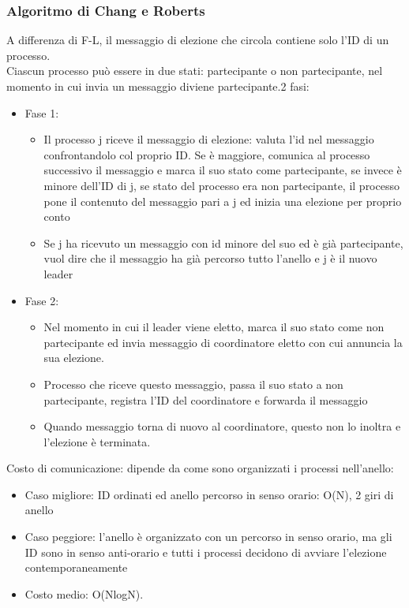 \documentclass{article}
\begin{document}
\subsubsection{Algoritmo di Chang e Roberts}
A differenza di F-L, il messaggio di elezione che circola contiene solo l'ID di un processo.\\ Ciascun processo può essere in due stati: partecipante o non partecipante, nel momento in cui invia un messaggio diviene partecipante.2 fasi:
\begin{itemize}
\item Fase 1:
\begin{itemize}
\item Il processo j riceve il messaggio di elezione: valuta l'id nel messaggio confrontandolo col proprio ID. Se è maggiore, comunica al processo successivo il messaggio e marca il suo stato come partecipante, se invece è minore dell'ID di j, se stato del processo era non partecipante, il processo pone il contenuto del messaggio pari a j ed inizia una elezione per proprio conto
\item Se j ha ricevuto un messaggio con id minore del suo ed è già partecipante, vuol dire che il messaggio ha già percorso tutto l'anello e j è il nuovo leader
\end{itemize}
\item Fase 2:
\begin{itemize}
\item Nel momento in cui il leader viene eletto, marca il suo stato come non partecipante ed invia messaggio di coordinatore eletto con cui annuncia la sua elezione.
\item Processo che riceve questo messaggio, passa il suo stato a non partecipante, registra l'ID del coordinatore e forwarda il messaggio
\item Quando messaggio torna di nuovo al coordinatore, questo non lo inoltra e l'elezione è terminata.
\end{itemize}
\end{itemize}
Costo di comunicazione: dipende da come sono organizzati i processi nell'anello:
\begin{itemize}
\item Caso migliore: ID ordinati ed anello percorso in senso orario: O(N), 2 giri di anello
\item Caso peggiore: l'anello è organizzato con un percorso in senso orario, ma gli ID sono in senso anti-orario e tutti i processi decidono di avviare l'elezione contemporaneamente
\item Costo medio: O(NlogN).
\end{itemize}
\end{document}
